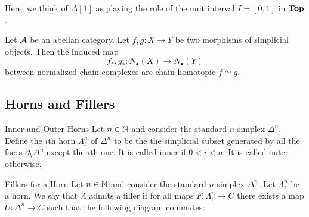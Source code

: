 \documentclass[a4paper]{article}
\begin{document}
Here, we think of $\Delta[1]$ as playing the role of the unit interval $I=[0,1]$ in $\bold{Top}$.

\begin{prp}{}{} Let $\mathcal{A}$ be an abelian category. Let $f,g:X\to Y$ be two morphisms of simplicial objects. Then the induced map $$f_\ast,g_\ast:N_\bullet(X)\to N_\bullet(Y)$$ between normalized chain complexes are chain homotopic $f\simeq g$. 
\end{prp}

\subsection{Horns and Fillers}
\begin{defn}{Inner and Outer Horns}{} Let $n\in\mathbb{N}$ and consider the standard $n$-simplex $\Delta^n$. Define the $i$th horn $\Lambda_i^n$ of $\Delta^n$ to be the the simplicial subset generated by all the faces $\partial_k\Delta^n$ except the $i$th one. It is called inner if $0<i<n$. It is called outer otherwise. 
\end{defn}

\begin{defn}{Fillers for a Horn}{} Let $n\in\mathbb{N}$ and consider the standard $n$-simplex $\Delta^n$. Let $\Lambda_i^n$ be a horn. We say that $\Lambda$ admits a filler if for all maps $F:\Lambda_i^n\to C$ there exists a map $U:\Delta^n\to C$ such that the following diagram commutes: \\~\\
\end{defn}
\end{document}
